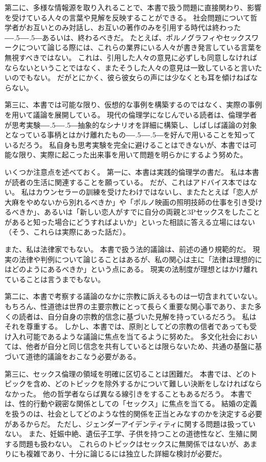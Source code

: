 \documentclass[paper=a4,book,openany]{jlreq}
\def\DDASH{―\kern-.5\zw―\kern-.5\zw―}
\begin{document}
第二に、多様な情報源を取り入れることで、本書で扱う問題に直接関わり、影響を受けている人々の言葉や見解を反映することができる。
社会問題について哲学者がお互いとのみ対話し、お互いの著作のみを引用する時代は終わった{\DDASH}あるいは、終わるべきだ。
たとえば、ポルノグラフィやセックスワークについて論じる際には、これらの業界にいる人々が書き発言している言葉を無視すべきではない。
これは、引用した人々の意見に必ずしも同意しなければならないということではなく、またそうした人々の意見は一致していると言いたいのでもない。
だがとにかく、彼ら彼女らの声には少なくとも耳を傾けねばならない。

第三に、本書では可能な限り、仮想的な事例を構築するのではなく、実際の事例を用いて議論を展開している。
現代の倫理学になじんでいる読者は、倫理学者が思考実験{\DDASH}抽象的なシナリオを詳細に構築し、しばしば議論の対象となっている事柄とはかけ離れたもの{\DDASH}を好んで用いることを知っているだろう。
私自身も思考実験を完全に避けることはできないが、本書では可能な限り、実際に起こった出来事を用いて問題を明らかにするよう努めた。

いくつか注意点を述べておく。
第一に、本書は実践的倫理学の書だ。
私は本書が読者の生活に関連することを願っている。
だが、これはアドバイス本ではない。
私はカウンセラーの訓練を受けたわけではないし、またたとえば「恋人が大麻をやめないから別れるべきか」や「ポルノ映画の照明技師の仕事を引き受けるべきか」、あるいは「新しい恋人がすでに自分の両親と3Pセックスをしたことがあると知った場合にどうすればよいか」といった相談に答える立場にはない（そう、これらは実際にあった話だ\citep{savage21:_mum_dat}）。

また、私は法律家でもない。
本書で扱う法的議論は、前述の通り規範的だ。
現実の法律や判例について論じることはあるが、私の関心は主に「法律は理想的にはどのようにあるべきか」という点にある。
現実の法制度が理想とはかけ離れていることは言うまでもない。

第二に、本書で考察する議論のなかに宗教に訴えるものは一切含まれていない。
もちろん、性道徳は世界の主要宗教にとって長らく重要な関心事であり、また多くの読者は、自分自身の宗教的信念に基づいた見解を持っているだろう。
私はそれを尊重する。
しかし、本書では、原則としてどの宗教の信者であっても受け入れ可能であるような議論に焦点を当てるように努めた。
多文化社会においては、他者が自分と同じ信念を共有しているとは限らないため、共通の基盤に基づいて道徳的議論をおこなう必要がある。

第三に、セックス倫理の領域を明確に区切ることは困難だ。
本書では、どのトピックを含め、どのトピックを除外するかについて難しい決断をしなければならなかった。
他の哲学者ならば異なる線引きをすることもあるだろう。
本書では、性的行動や親密な関係としての「セックス」に焦点を当てる。
結婚の定義を扱うのは、社会としてどのような性的関係を正当とみなすのかを決定する必要があるからだ。
ただし、ジェンダーアイデンティティに関する問題は扱っていない。
また、妊娠中絶、遺伝子工学、子供を持つことの道徳性など、生殖に関する問題も扱わない。
これらのトピックはセックスに無関係ではないが、あまりにも複雑であり、十分に論じるには独立した詳細な検討が必要だ。
\end{document}
